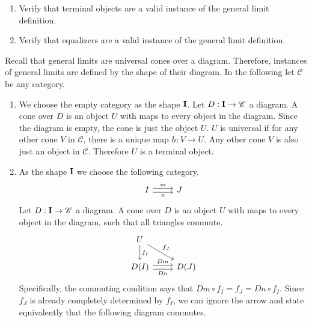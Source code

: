 \def\pathToRoot{../../}

\usepackage{upgreek}



\author{Leonhard Staut}

\begin{exercise}
  \begin{enumerate}
  \item Verify that terminal objects are a valid instance of the general limit definition.
  \item Verify that equalizers are a valid instance of the general limit definition.
  \end{enumerate}
\end{exercise}
\begin{answer}
  Recall that general limits are universal cones over a diagram.
  Therefore, instances of general limits are defined by the shape of their diagram.
  In the following let $\mathscr{C}$ be any category.
  \begin{enumerate}
  \item
    We choose the empty category as the shape $\bf{I}$.
    Let $D : \bf{I} \to \mathscr{C}$ a diagram. A cone over $D$ is an object $U$ with
    maps to every object in the diagram. Since the diagram is empty, the cone is just
    the object $U$.
    $U$ is universal if for any other cone $V$ in $\mathscr{C}$, there is a unique map
    $h : V \to U$.
    Any other cone $V$ is also just an object in $\mathscr{C}$.
    Therefore $U$ is a terminal object.
  \item
    As the shape $\bf{I}$ we choose the following category.
    \[
      \begin{tikzcd}
        I \arrow[r,shift left, "m"] \arrow[r,shift right,swap,"n"] & J
      \end{tikzcd}
    \]
    Let $D : \bf{I} \to \mathscr{C}$ a diagram.
    A cone over $D$ is an object $U$ with maps to every object in the diagram, such that all triangles commute.
    \[
      \begin{tikzcd}
        U \arrow{d}{f_I} \arrow{dr}{f_J} & \\
        D(I) \arrow[r,shift left, "Dm"] \arrow[r,shift right,swap,"Dn"] & D(J)
      \end{tikzcd}
    \]
    Specifically, the commuting condition says that $Dm \circ f_I = f_J = Dn \circ f_I$.
    Since $f_J$ is already completely determined by $f_I$, we can ignore the arrow
    and state equivalently that the following diagram commutes.

\end{enumerate}
\end{answer}
